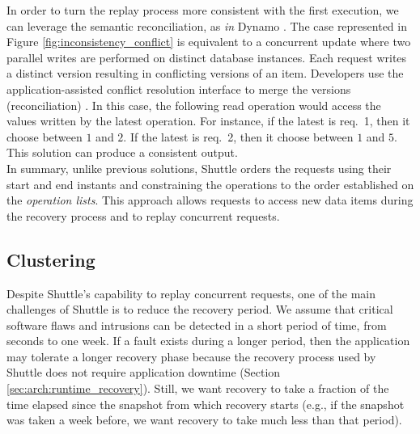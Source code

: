 In order to turn the replay process more consistent with the first execution, we can leverage the semantic reconciliation, as \textit{in} Dynamo \cite{Decandia2007}. The case represented in Figure \ref{fig:inconsistency_conflict} is equivalent to a concurrent update where two parallel writes are performed on distinct database instances. Each request writes a distinct version resulting in conflicting versions of an item. Developers use the application-assisted conflict resolution interface to merge the versions (reconciliation) \cite{Decandia2007}. In this case, the following read operation would access the values written by the latest operation. For instance, if the latest is {req.~1}, then it choose between $1$ and $2$. If the latest is {req.~2}, then it choose between $1$ and $5$. This solution can produce a consistent output.\\

In summary, unlike previous solutions, Shuttle orders the requests using their start and end instants and constraining the operations to the order established on the \textit{operation lists}. This approach allows requests to access new data items during the recovery process and to replay concurrent requests.





\subsection{Clustering}
\label{sec:arch:clustering}

Despite Shuttle's capability to replay concurrent requests, one of the main challenges of Shuttle is to reduce the recovery period. We assume that critical software flaws and intrusions can be detected in a short period of time, from seconds to one week. If a fault exists during a longer period, then the application may tolerate a longer recovery phase because the recovery process used by Shuttle does not require application downtime (Section \ref{sec:arch:runtime_recovery}). Still, we want recovery to take a fraction of the time elapsed since the snapshot from which recovery starts (e.g., if the snapshot was taken a week before, we want recovery to take much less than that period).  

